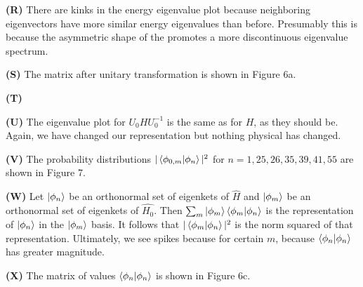 \documentclass[12pt]{article}
\theoremstyle{definition}
\begin{document}
{\vspace{0.1in}
\noindent \textbf{(R)} There are kinks in the energy eigenvalue plot because neighboring eigenvectors have more similar energy eigenvalues than before. Presumably this is because the asymmetric shape of the promotes a more discontinuous eigenvalue spectrum.

\vspace{0.1in}
\noindent \textbf{(S)} The matrix after unitary transformation is shown in Figure 6a.

\vspace{0.1in}
\noindent \textbf{(T)} 

\vspace{0.1in}
\noindent \textbf{(U)} The eigenvalue plot for $U_{0}H U_{0}^{-1}$ is the same as for $H$, as they should be. Again, we have changed our representation but nothing physical has changed.

\vspace{0.1in}
\noindent \textbf{(V)} The probability distributions $|\bra{\phi_{0,m}}\ket{\phi_{n}}|^{2}$ for $n=1, 25, 26, 35, 39, 41, 55$ are shown in Figure 7.

\vspace{0.1in}
\noindent \textbf{(W)} Let $\ket{\phi_{n}}$ be an orthonormal set of eigenkets of $\hat{H}$ and $\ket{\phi_{m}}$ be an orthonormal set of eigenkets of $\hat{H_{0}}$. Then $\sum_{m}\ket{\phi_{m}}\bra{\phi_{m}}\ket{\phi_{n}}$ is the representation of $\ket{\phi_{n}}$ in the $\ket{\phi_{m}}$ basis. It follows that $|\bra{\phi_{m}}\ket{\phi_{n}}|^{2}$ is the norm squared of that representation. Ultimately, we see spikes because for certain $m$, because $\bra{\phi_{n}}\ket{\phi_{n}}$ has greater magnitude.

\vspace{0.1in}
\noindent \textbf{(X)} The matrix of values $\bra{\phi_{n}}\ket{\phi_{n}}$ is shown in Figure 6c.

}
\end{document}
